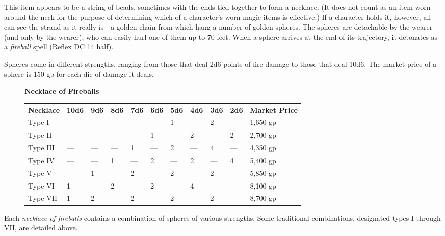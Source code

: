This item appears to be a string of beads, sometimes with the ends tied together to form a necklace. (It does not count as an item worn around the neck for the purpose of determining which of a character's worn magic items is effective.) If a character holds it, however, all can see the strand as it really is---a golden chain from which hang a number of golden spheres. The spheres are detachable by the wearer (and only by the wearer), who can easily hurl one of them up to 70 feet. When a sphere arrives at the end of its trajectory, it detonates as a\textit{ fireball} spell (Reflex DC 14 half).
				
Spheres come in different strengths, ranging from those that deal 2d6 points of fire damage to those that deal 10d6. The market price of a sphere is 150 gp for each die of damage it deals.
\begin{figure*}[]
\sffamily
\textbf{Necklace of Fireballs}
\begin{tabular}{lllllllllll}
\textbf{Necklace} & \textbf{10d6} & \textbf{9d6} & \textbf{8d6} & \textbf{7d6} & \textbf{6d6} & \textbf{5d6} & \textbf{4d6} & \textbf{3d6} & \textbf{2d6} & \textbf{Market Price} \\
Type I            & ---             & ---            & ---            & ---            & ---            & 1            & ---            & 2            & ---            & 1,650 gp              \\
Type II           & ---             & ---            & ---            & ---            & 1            & ---            & 2            & ---            & 2            & 2,700 gp              \\
Type III          & ---             & ---            & ---            & 1            & ---            & 2            & ---            & 4            & ---            & 4,350 gp              \\
Type IV           & ---             & ---            & 1            & ---            & 2            & ---            & 2            & ---            & 4            & 5,400 gp              \\
Type V            & ---             & 1            & ---            & 2            & ---            & 2            & ---            & 2            & ---            & 5,850 gp              \\
Type VI           & 1             & ---            & 2            & ---            & 2            & ---            & 4            & ---            & ---            & 8,100 gp              \\
Type VII          & 1             & 2            & ---            & 2            & ---            & 2            & ---            & 2            & ---            & 8,700 gp             
\end{tabular}
\end{figure*}				
Each \textit{necklace of fireballs} contains a combination of spheres of various strengths. Some traditional combinations, designated types I through VII, are detailed above.
				
